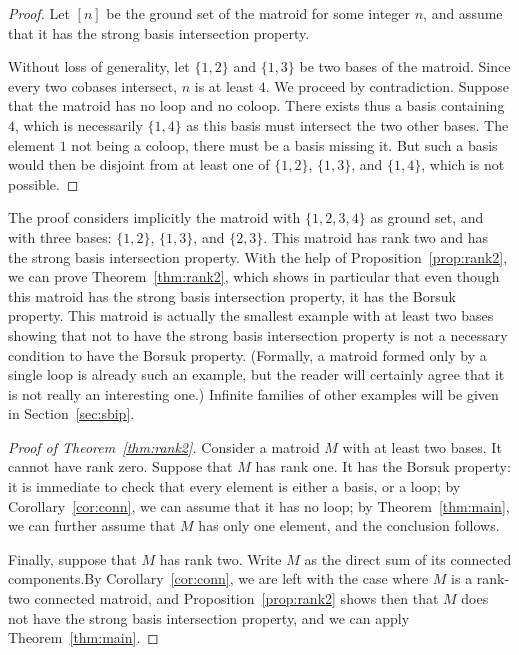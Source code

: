 \documentclass[12pt]{amsart}
\theoremstyle{plain}
\theoremstyle{definition}
\theoremstyle{remark}
\begin{document}
\begin{proof}
Let $[n]$ be the ground set of the matroid for some integer $n$, and assume that it has the strong basis intersection property.

Without loss of generality, let $\{1,2\}$ and $\{1,3\}$ be two bases of the matroid. Since every two cobases intersect, $n$ is at least $4$. We proceed by contradiction. Suppose that the matroid has no loop and no coloop. There exists thus a basis containing $4$, which is necessarily $\{1,4\}$ as this basis must intersect the two other bases. The element $1$ not being a coloop, there must be a basis missing it. But such a basis would then be disjoint from at least one of  $\{1,2\}$, $\{1,3\}$, and $\{1,4\}$, which is not possible.
\end{proof}

The proof considers implicitly the matroid with $\{1,2,3,4\}$ as ground set, and with three bases: $\{1,2\}$, $\{1,3\}$, and $\{2,3\}$. This matroid has rank two and has the strong basis intersection property. With the help of Proposition~\ref{prop:rank2}, we can prove Theorem~\ref{thm:rank2}, which shows in particular that even though this matroid has the strong basis intersection property, it has the Borsuk property. This matroid is actually the smallest example with at least two bases showing that not to have the strong basis intersection property is not a necessary condition to have the Borsuk property. (Formally, a matroid formed only by a single loop is already such an example, but the reader will certainly agree that it is not really an interesting one.) Infinite families of other examples will be given in Section~\ref{sec:sbip}.


\begin{proof}[Proof of Theorem~\ref{thm:rank2}]
Consider a matroid $M$ with at least two bases. It cannot have rank zero. Suppose that $M$ has rank one. It has the Borsuk property: it is immediate to check that every element is either a basis, or a loop; by Corollary~\ref{cor:conn}, we can assume that it has no loop; by Theorem~\ref{thm:main}, we can further assume that $M$ has only one element, and the conclusion follows. 

Finally, suppose that $M$ has rank two. Write $M$ as the direct sum of its connected components.By Corollary~\ref{cor:conn}, we are left with the case where $M$ is a rank-two connected matroid, and Proposition~\ref{prop:rank2} shows then that $M$ does not have the strong basis intersection property, and we can apply Theorem~\ref{thm:main}.
\end{proof}
\end{document}
